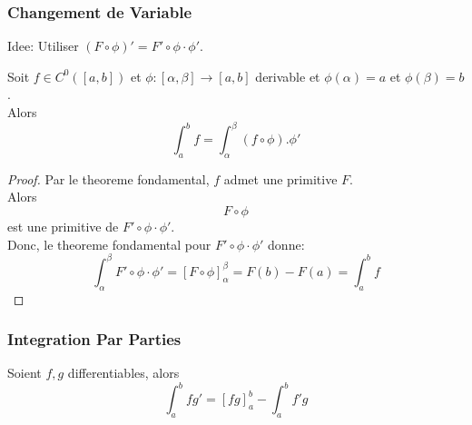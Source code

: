 \documentclass[../main.tex]{subfiles}
\begin{document}
\subsubsection{Changement de Variable}
Idee: Utiliser $( F \circ \phi )' = F' \circ \phi \cdot \phi'$.
\begin{propo}
	Soit $f \in C^{0}( [ a,b] ) $ et $\phi: [ \alpha, \beta] \to [ a,b] $ derivable et $\phi( \alpha) = a$ et $\phi( \beta) = b$.\\
	Alors
	\[ 
		\int_{ a }^{ b }f = \int_{ \alpha }^{ \beta }( f\circ \phi) . \phi'
	\]

\end{propo}
\begin{proof}
Par le theoreme fondamental, $f$ admet une primitive $F$.\\
Alors
\[ 
F \circ \phi
\]
est une primitive de $F'\circ \phi \cdot \phi'$.\\
Donc, le theoreme fondamental pour $F' \circ \phi\cdot \phi'$ donne:
\[ 
	\int_{ \alpha }^{ \beta }F'\circ \phi \cdot \phi' = [ F\circ \phi]_{\alpha} ^{\beta} = F( b) - F( a) = \int_{ a }^{ b }f
\]

\end{proof}
\subsubsection{Integration Par Parties}
\begin{propo}
Soient $f,g$ differentiables, alors
\[ 
\int_{ a }^{ b }fg' = [ fg] _{a} ^{b}- \int_{ a }^{ b }f'g
\]

\end{propo}
\end{document}
